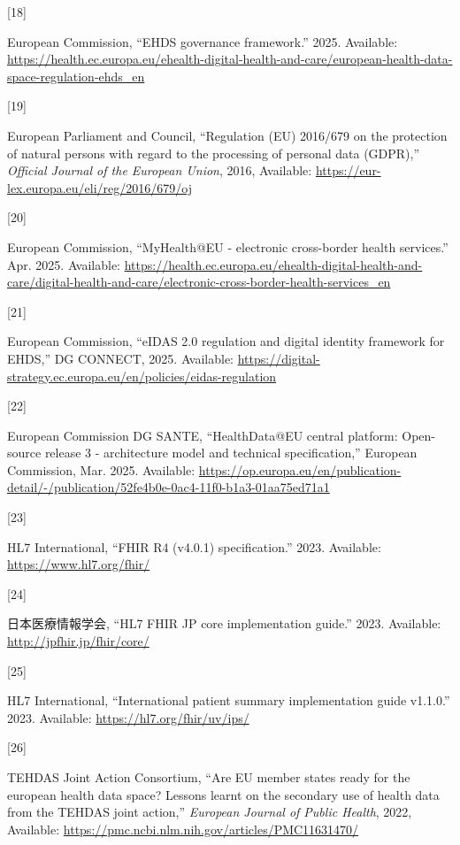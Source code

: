 \documentclass[
  a4paper,
  a4paper,
  11pt]{ltjsbook}
\newlength{\cslhangindent}
\newlength{\csllabelwidth}
\newenvironment{CSLReferences}[2] %
 {\begin{list}{}{%
  \setlength{\itemindent}{0pt}
  \setlength{\leftmargin}{0pt}
  \setlength{\parsep}{0pt}
  \ifodd #1
   \setlength{\leftmargin}{\cslhangindent}
   \setlength{\itemindent}{-1\cslhangindent}
  \fi
  \setlength{\itemsep}{#2\baselineskip}}}
 {\end{list}}
\newcommand{\CSLLeftMargin}[1]{\parbox[t]{\csllabelwidth}{\strut#1\strut}}
\newcommand{\CSLRightInline}[1]{\parbox[t]{\linewidth - \csllabelwidth}{\strut#1\strut}}
\begin{document}
\begin{CSLReferences}{0}{0}
\CSLLeftMargin{{[}18{]} }%
\CSLRightInline{European Commission, {``EHDS governance framework.''}
2025. Available:
\url{https://health.ec.europa.eu/ehealth-digital-health-and-care/european-health-data-space-regulation-ehds_en}}

\CSLLeftMargin{{[}19{]} }%
\CSLRightInline{European Parliament and Council, {``Regulation (EU)
2016/679 on the protection of natural persons with regard to the
processing of personal data (GDPR),''} \emph{Official Journal of the
European Union}, 2016, Available:
\url{https://eur-lex.europa.eu/eli/reg/2016/679/oj}}

\CSLLeftMargin{{[}20{]} }%
\CSLRightInline{European Commission, {``MyHealth@EU - electronic
cross-border health services.''} Apr. 2025. Available:
\url{https://health.ec.europa.eu/ehealth-digital-health-and-care/digital-health-and-care/electronic-cross-border-health-services_en}}

\CSLLeftMargin{{[}21{]} }%
\CSLRightInline{European Commission, {``eIDAS 2.0 regulation and digital
identity framework for EHDS,''} DG CONNECT, 2025. Available:
\url{https://digital-strategy.ec.europa.eu/en/policies/eidas-regulation}}

\CSLLeftMargin{{[}22{]} }%
\CSLRightInline{European Commission DG SANTE, {``HealthData@EU central
platform: Open-source release 3 - architecture model and technical
specification,''} European Commission, Mar. 2025. Available:
\url{https://op.europa.eu/en/publication-detail/-/publication/52fe4b0e-0ac4-11f0-b1a3-01aa75ed71a1}}

\CSLLeftMargin{{[}23{]} }%
\CSLRightInline{HL7 International, {``FHIR R4 (v4.0.1) specification.''}
2023. Available: \url{https://www.hl7.org/fhir/}}

\CSLLeftMargin{{[}24{]} }%
\CSLRightInline{日本医療情報学会, {``HL7 FHIR JP core implementation
guide.''} 2023. Available: \url{http://jpfhir.jp/fhir/core/}}

\CSLLeftMargin{{[}25{]} }%
\CSLRightInline{HL7 International, {``International patient summary
implementation guide v1.1.0.''} 2023. Available:
\url{https://hl7.org/fhir/uv/ips/}}

\CSLLeftMargin{{[}26{]} }%
\CSLRightInline{TEHDAS Joint Action Consortium, {``Are EU member states
ready for the european health data space? Lessons learnt on the
secondary use of health data from the TEHDAS joint action,''}
\emph{European Journal of Public Health}, 2022, Available:
\url{https://pmc.ncbi.nlm.nih.gov/articles/PMC11631470/}}


\end{CSLReferences}
\end{document}
